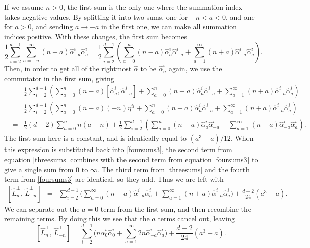 \documentclass[a4paper,12pt]{article}
\numberwithin{equation}{section}
\begin{document}
If we assume $n>0$, the first sum is the only one where the summation index takes negative values. By splitting it into two sums, one for $-n< a<0$, and one for $a>0$, and sending $a\to -a$ in the first one, we can make all summation indices positive. With these changes, the first sum becomes
\begin{equation}
\frac{1}{2}\sum_{i=2}^{d-1}\sum_{a=-n}^\infty (n+a)\hat{\alpha}_{-a}^i\hat{\alpha}_{a}^i = \frac{1}{2}\sum_{i=2}^{d-1}\left(\sum_{a=0}^n(n-a)\hat{\alpha}_a^i\hat{\alpha}_{-a}^i + \sum_{a=1}^\infty(n+a)\hat{\alpha}_{-a}^i\hat{\alpha}_a^i\right).
\end{equation}
Then, in order to get all of the rightmost $\hat{\alpha}$ to be $\hat{\alpha}_n^i$ again, we use the commutator in the first sum, giving
\begin{eqnarray}\label{threesums}
&&\frac{1}{2}\sum_{i=2}^{d-1}\left(\sum_{a=0}^n(n-a)\left[\hat{\alpha}_a^i,\hat{\alpha}_{-a}^i\right] +\sum_{a=0}^n(n-a)\hat{\alpha}_a^i\hat{\alpha}_{-a}^i + \sum_{a=1}^\infty(n+a)\hat{\alpha}_{-a}^i\hat{\alpha}_a^i\right)\nonumber\\
&=&\frac{1}{2}\sum_{i=2}^{d-1}\left(\sum_{a=0}^n(n-a)(-n)\eta^{i i} +\sum_{a=0}^n(n-a)\hat{\alpha}_a^i\hat{\alpha}_{-a}^i + \sum_{a=1}^\infty(n+a)\hat{\alpha}_{-a}^i\hat{\alpha}_a^i\right)\nonumber\\
&=&\frac{1}{2}(d-2)\sum_{a=0}^n n(a-n)+\frac{1}{2}\sum_{i=2}^{d-1}\left(\sum_{a=0}^n(n-a)\hat{\alpha}_a^i\hat{\alpha}_{-a}^i + \sum_{a=1}^\infty(n+a)\hat{\alpha}_{-a}^i\hat{\alpha}_a^i\right).
\end{eqnarray}
The first sum here is a constant, and is identically equal to $(a^3-a)/12$. When this expression is substituted back into \ref{foursums3}, the second term from equation \ref{threesums} combines with the second term from equation \ref{foursums3} to give a single sum from 0 to $\infty$. The third term from \ref{threesums} and the fourth term from \ref{foursums3} are identical, so they add. Thus we are left with
\begin{eqnarray}
\left[\hat{L}_n^\perp,\,\hat{L}_{-n}^\perp\right]&=& \sum_{i=2}^{d-1}\Big(\sum_{a=0}^\infty (n-a)\hat{\alpha}_{-a}^i\hat{\alpha}_{a}^i +\sum_{a = 1}^\infty (n+a)\hat{\alpha}_{-a}^i\hat{\alpha}_{a}^i\Big) + \frac{d-2}{24}(a^3-a).
\end{eqnarray}
We can separate out the $a=0$ term from the first sum, and then recombine the remaining terms. By doing this we see that the $a$ terms cancel out, leaving
\begin{equation}\label{virasorocomm1}
\left[\hat{L}_n^\perp,\,\hat{L}_{-n}^\perp\right]= \sum_{i=2}^{d-1}\Big(n\hat{\alpha}_0^i\hat{\alpha}_0^i + \sum_{a=1}^\infty 2n\hat{\alpha}_{-a}^i\hat{\alpha}_{a}^i\Big) + \frac{d-2}{24}(a^3-a).
\end{equation}
\end{document}
